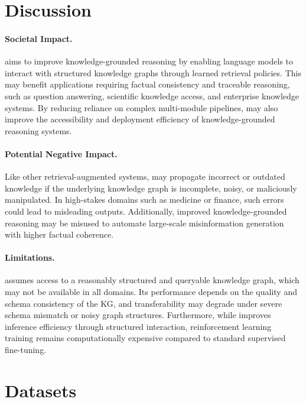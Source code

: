 \section{Discussion}
\label{sec:discussion}

\paragraph{\textbf{Societal Impact.}}
\framework{} aims to improve knowledge-grounded reasoning by enabling language models to interact with structured knowledge graphs through learned retrieval policies. This may benefit applications requiring factual consistency and traceable reasoning, such as question answering, scientific knowledge access, and enterprise knowledge systems. By reducing reliance on complex multi-module pipelines, \framework{} may also improve the accessibility and deployment efficiency of knowledge-grounded reasoning systems.

\paragraph{\textbf{Potential Negative Impact.}}
Like other retrieval-augmented systems, \framework{} may propagate incorrect or outdated knowledge if the underlying knowledge graph is incomplete, noisy, or maliciously manipulated. In high-stakes domains such as medicine or finance, such errors could lead to misleading outputs. Additionally, improved knowledge-grounded reasoning may be misused to automate large-scale misinformation generation with higher factual coherence.

\paragraph{\textbf{Limitations.}}
\framework{} assumes access to a reasonably structured and queryable knowledge graph, which may not be available in all domains. Its performance depends on the quality and schema consistency of the KG, and transferability may degrade under severe schema mismatch or noisy graph structures. Furthermore, while \framework{} improves inference efficiency through structured interaction, reinforcement learning training remains computationally expensive compared to standard supervised fine-tuning.



\section{Datasets}
\label{appendix:datasets}


